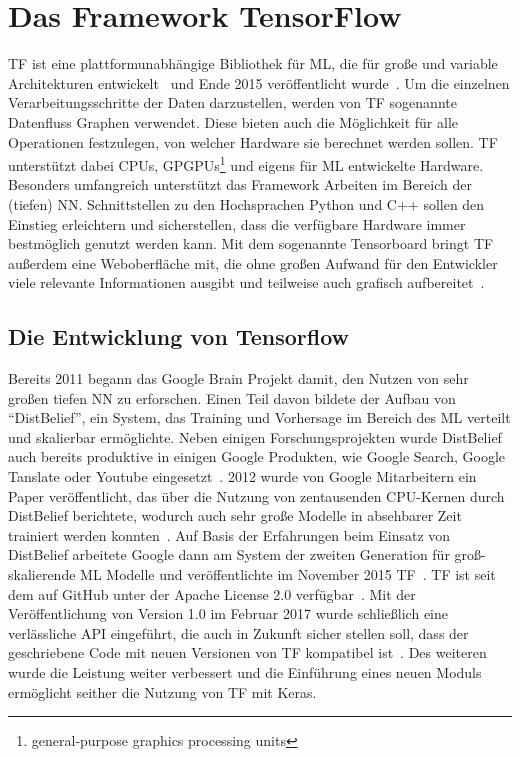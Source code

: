 \chapter{Das Framework TensorFlow}

\gls{TF} ist eine plattformunabhängige Bibliothek für \gls{ML}, die für große und variable Architekturen entwickelt~\cite{tensorflow2015-whitepaper} und Ende 2015 veröffentlicht wurde~\cite{tf-opensource}. Um die einzelnen Verarbeitungsschritte der Daten darzustellen, werden von \gls{TF} sogenannte Datenfluss Graphen verwendet. Diese bieten auch die Möglichkeit für alle Operationen festzulegen, von welcher Hardware sie berechnet werden sollen. \gls{TF} unterstützt dabei CPUs, GPGPUs\footnote{general-purpose graphics processing units} und eigens für \gls{ML} entwickelte Hardware.
Besonders umfangreich unterstützt das Framework Arbeiten im Bereich der (tiefen) \gls{NN}. Schnittstellen zu den Hochsprachen Python und C++ sollen den Einstieg erleichtern und sicherstellen, dass die verfügbare Hardware immer bestmöglich genutzt werden kann. Mit dem sogenannte Tensorboard bringt \gls{TF} außerdem eine Weboberfläche mit, die ohne großen Aufwand für den Entwickler viele relevante Informationen ausgibt und teilweise auch grafisch aufbereitet~\cite{tensorflow2016-whitepaper}.

\section{Die Entwicklung von Tensorflow}
Bereits 2011 begann das Google Brain Projekt damit, den Nutzen von sehr großen tiefen \gls{NN} zu erforschen. Einen Teil davon bildete der Aufbau von "`DistBelief"', ein System, das Training und Vorhersage im Bereich des \gls{ML} verteilt und skalierbar ermöglichte. Neben einigen Forschungsprojekten wurde DistBelief auch bereits produktive in einigen Google Produkten, wie Google Search, Google Tanslate oder Youtube eingesetzt~\cite{tensorflow2016-whitepaper}. 2012 wurde von Google Mitarbeitern ein Paper veröffentlicht, das über die Nutzung von zentausenden CPU-Kernen  durch DistBelief berichtete, wodurch auch sehr große Modelle in absehbarer Zeit trainiert werden konnten~\cite{NIPS2012}. Auf Basis der Erfahrungen beim Einsatz von DistBelief arbeitete Google dann am System der zweiten Generation für groß-skalierende \gls{ML} Modelle und veröffentlichte im November 2015 \gls{TF}~\cite{tf-opensource}. \gls{TF} ist seit dem auf GitHub unter der Apache License 2.0 verfügbar~\cite{tf-git}.  Mit der Veröffentlichung von Version 1.0 im Februar 2017 wurde schließlich eine verlässliche API eingeführt, die auch in Zukunft sicher stellen soll, dass der geschriebene Code mit neuen Versionen von \gls{TF} kompatibel ist~\cite{tf1}. Des weiteren wurde die Leistung weiter verbessert und die Einführung eines neuen Moduls ermöglicht seither die Nutzung von \gls{TF} mit Keras.

